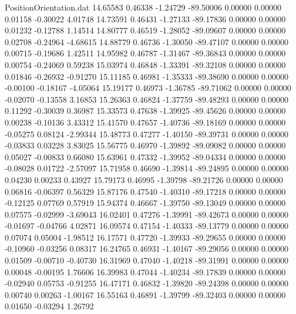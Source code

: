 \begin{filecontents}{PositionOrientation.dat}
  14.65583    0.46338   -1.24729   -89.50006    0.00000    0.00000    0.01158   -0.30022    4.01748
  14.73591    0.46431   -1.27133   -89.17836    0.00000    0.00000    0.01232   -0.12788    1.14514
  14.80777    0.46519   -1.28052   -89.09607    0.00000    0.00000    0.02708   -0.24964   -4.68615
  14.88779    0.46736   -1.30050   -89.47107    0.00000    0.00000    0.00715   -0.19686    1.42511
  14.95982    0.46787   -1.31467   -89.36843    0.00000    0.00000    0.00754   -0.24069    0.59238
  15.03974    0.46848   -1.33391   -89.32108    0.00000    0.00000    0.01846   -0.26932   -0.91270
  15.11185    0.46981   -1.35333   -89.38690    0.00000    0.00000   -0.00100   -0.18167   -4.05064
  15.19177    0.46973   -1.36785   -89.71062    0.00000    0.00000   -0.02070   -0.13558    3.16853
  15.26363    0.46824   -1.37759   -89.48293    0.00000    0.00000    0.11292   -0.30039    0.36987
  15.33573    0.47638   -1.39925   -89.45626    0.00000    0.00000    0.00238   -0.10136    3.43312
  15.41570    0.47657   -1.40736   -89.18169    0.00000    0.00000   -0.05275    0.08124   -2.99344
  15.48773    0.47277   -1.40150   -89.39731    0.00000    0.00000   -0.03833    0.03228    3.83025
  15.56775    0.46970   -1.39892   -89.09082    0.00000    0.00000    0.05027   -0.00833    0.66080
  15.63961    0.47332   -1.39952   -89.04334    0.00000    0.00000   -0.08028    0.01722   -2.57097
  15.71958    0.46690   -1.39814   -89.24895    0.00000    0.00000    0.04230    0.00233    0.43927
  15.79173    0.46995   -1.39798   -89.21726    0.00000    0.00000    0.06816   -0.06397    0.56329
  15.87176    0.47540   -1.40310   -89.17218    0.00000    0.00000   -0.12125    0.07769    0.57919
  15.94374    0.46667   -1.39750   -89.13049    0.00000    0.00000    0.07575   -0.02999   -3.69043
  16.02401    0.47276   -1.39991   -89.42673    0.00000    0.00000   -0.01697   -0.04766    4.02871
  16.09574    0.47154   -1.40333   -89.13779    0.00000    0.00000    0.07074    0.05004   -1.98512
  16.17571    0.47720   -1.39933   -89.29655    0.00000    0.00000   -0.10960   -0.03256    0.08317
  16.24765    0.46931   -1.40167   -89.29056    0.00000    0.00000    0.01509   -0.00710   -0.40730
  16.31969    0.47040   -1.40218   -89.31991    0.00000    0.00000    0.00048   -0.00195    1.76606
  16.39983    0.47044   -1.40234   -89.17839    0.00000    0.00000   -0.02940    0.05753   -0.91255
  16.47171    0.46832   -1.39820   -89.24398    0.00000    0.00000    0.00740    0.00263   -1.00167
  16.55163    0.46891   -1.39799   -89.32403    0.00000    0.00000    0.01650   -0.03294    1.26792

\end{filecontents}
